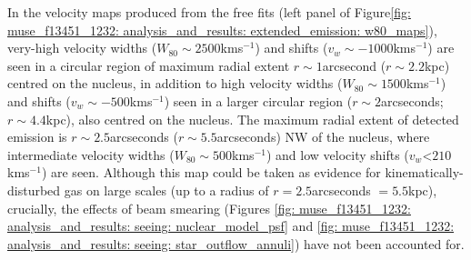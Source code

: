 In the velocity maps produced from the free fits (left panel of Figure\;\ref{fig: muse_f13451_1232: analysis_and_results: extended_emission: w80_maps}), very-high velocity widths ($W_\mathrm{80}\sim2500$\;km\;s$^{-1}$) and shifts ($v_w\sim-1000$\;km\;s$^{-1}$) are seen in a circular region of maximum radial extent $r\sim1$\;arcsecond ($r\sim2.2$\;kpc) centred on the nucleus, in addition to high velocity widths ($W_\mathrm{80}\sim1500$\;km\;s$^{-1}$) and shifts ($v_w\sim-500$\;km\;s$^{-1}$) seen in a larger circular region ($r\sim2$\;arcseconds; $r\sim4.4$\;kpc), also centred on the nucleus. The maximum radial extent of detected emission is $r\sim2.5$\;arcseconds ($r\sim5.5$\;arcseconds) NW of the nucleus, where intermediate velocity widths ($W_\mathrm{80}\sim500$\;km\;s$^{-1}$) and low velocity shifts ($v_w$\;\textless\;$210$\;km\;s$^{-1}$) are seen. Although this map could be taken as evidence for kinematically-disturbed gas on large scales (up to a radius of $r=2.5$\;arcseconds $=5.5$\;kpc), crucially, the effects of beam smearing (Figures \ref{fig: muse_f13451_1232: analysis_and_results: seeing: nuclear_model_psf} and \ref{fig: muse_f13451_1232: analysis_and_results: seeing: star_outflow_annuli}) have not been accounted for.


